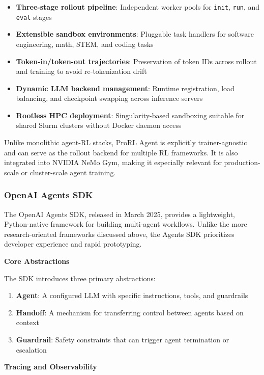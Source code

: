 \begin{itemize}
    \item \textbf{Three-stage rollout pipeline}: Independent worker pools for \texttt{init}, \texttt{run}, and \texttt{eval} stages
    \item \textbf{Extensible sandbox environments}: Pluggable task handlers for software engineering, math, STEM, and coding tasks
    \item \textbf{Token-in/token-out trajectories}: Preservation of token IDs across rollout and training to avoid re-tokenization drift
    \item \textbf{Dynamic LLM backend management}: Runtime registration, load balancing, and checkpoint swapping across inference servers
    \item \textbf{Rootless HPC deployment}: Singularity-based sandboxing suitable for shared Slurm clusters without Docker daemon access

\end{itemize}
Unlike monolithic agent-RL stacks, ProRL Agent is explicitly trainer-agnostic and can serve as the rollout backend for multiple RL frameworks. It is also integrated into NVIDIA NeMo Gym, making it especially relevant for production-scale or cluster-scale agent training.

\subsubsection{OpenAI Agents SDK}

The OpenAI Agents SDK, released in March 2025, provides a lightweight, Python-native framework for building multi-agent workflows. Unlike the more research-oriented frameworks discussed above, the Agents SDK prioritizes developer experience and rapid prototyping.

\textbf{Core Abstractions}

The SDK introduces three primary abstractions:

\begin{enumerate}
    \item \textbf{Agent}: A configured LLM with specific instructions, tools, and guardrails
    \item \textbf{Handoff}: A mechanism for transferring control between agents based on context
    \item \textbf{Guardrail}: Safety constraints that can trigger agent termination or escalation

\end{enumerate}
\textbf{Tracing and Observability}


